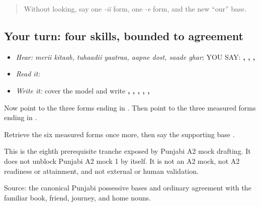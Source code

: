 \label{lesson:PA-C185-payoff}



\begin{quote}
Without looking, say one \emph{-ii} form, one \emph{-e} form, and the new “our” base.
\end{quote}

\subsection*{Your turn: four skills, bounded to agreement}
\begin{itemize}
\raggedright
  \item \emph{Hear:} \emph{merii kitaab, tuhaadii yaatraa, aapne dost, saade ghar}; YOU SAY: \textbf{ ,  ,  ,  }
  \item \emph{Read it:} \textbf{     }
  \item \emph{Write it:} cover the model and write \textbf{, , , , , }
\end{itemize}

Now point to the three forms ending in \textbf{}. Then point to the three measured forms ending in \textbf{}.

\begin{tcolorbox}[breakable,colback=teal!4,colframe=teal!35!black,title={Before you move on}]
Retrieve the six measured forms once more, then say the supporting base \textbf{}.

This is the eighth prerequisite tranche exposed by Punjabi A2 mock drafting. It does not unblock Punjabi A2 mock 1 by itself. It is not an A2 mock, not A2 readiness or attainment, and not external or human validation.

Source: the canonical Punjabi possessive bases and ordinary agreement with the familiar book, friend, journey, and home nouns.
\end{tcolorbox}
